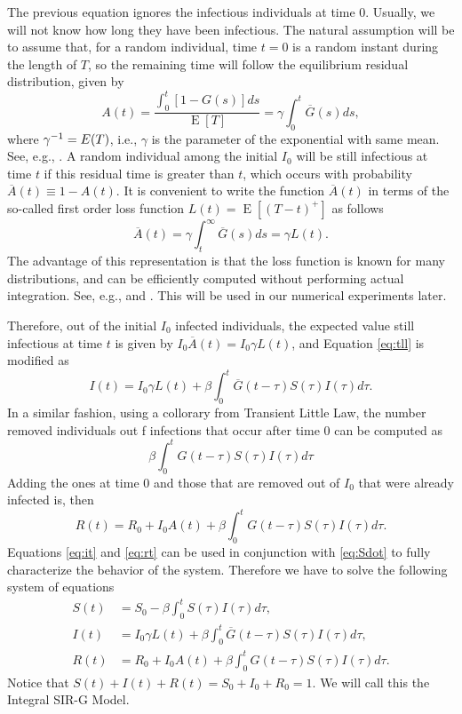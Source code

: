 \documentclass[twoside,USenglish,10pt]{article}
\newcommand{\eg}{e.g.\xspace}
\newcommand{\Ab}{\overline{A}\xspace}
\newcommand{\Gb}{\overline{G}\xspace}
\newcommand{\gami}{\ensuremath\gamma^{-1}\xspace}
\DeclareMathOperator{\Exp}{E}       %
\newcommand{\E}[1]{\Exp\left[{#1}\right]}       %
\begin{document}
The previous equation ignores the infectious individuals at time 0. Usually, we will not know how long they have been infectious. The natural assumption will be to assume that, for a random individual, time $t=0$ is a random instant during the length of $T$, so the remaining time will follow the equilibrium residual distribution, given by
\begin{equation}
	A(t) =  \frac{\int_0^t[1-G(s)]ds}{\Exp{[T]}} = \gamma \int_0^t \Gb(s)ds,
\label{eq:eqdist}
\end{equation}
where $\gami=E(T)$, i.e., $\gamma$ is the parameter of the exponential with same mean. See, e.g., \cite{kulk95}. A random individual among the initial $I_0$ will be still infectious at time $t$ if this residual time is greater than $t$, which occurs with probability $\Ab(t)\equiv 1- A(t)$. 
It is convenient to write the function  $\Ab(t)$ in terms of the so-called first order loss function $L(t)=\E{(T-t)^+}$ as follows
\[ \Ab(t) = \gamma \int_t^\infty \Gb(s)ds = \gamma L(t).\]
The advantage of this representation is that the loss function is known for many distributions, and can be efficiently computed without performing actual integration. See, \eg, \cite[Page 14]{burn.ea.10} and \cite[Appendix C]{zipk00}. This will be used in our numerical experiments later.

 

Therefore, out of the initial $I_0$ infected individuals, the expected value still infectious at time $t$ is given by $I_0\Ab(t)=I_0\gamma L(t)$, and Equation \eqref{eq:tll} is modified as
\begin{equation}
	I(t) = I_0\gamma L(t) + \beta\int_0^t \Gb(t-\tau) S(\tau)I(\tau)d\tau.   \label{eq:it}
\end{equation}
In a similar fashion, using a collorary from Transient Little Law, the number removed individuals out f infections that occur after time $0$ can be computed as 
\[ \beta\int_0^t G(t-\tau) S(\tau)I(\tau)d\tau\]
Adding the ones at time $0$ and those that are removed out of $I_0$ that were already infected is, then
\begin{equation}
	R(t) = R_0 + I_0A(t) + \beta\int_0^t G(t-\tau) S(\tau)I(\tau)d\tau.   \label{eq:rt}
\end{equation}
Equations \eqref{eq:it} and \eqref{eq:rt} can be used in conjunction with \eqref{eq:Sdot} to fully characterize the behavior of the system. Therefore we have to solve the following system of equations
\begin{subequations}
\begin{align}
S(t) &= S_0 - \beta\int_0^t  S(\tau)I(\tau)d\tau, \label{eq:st2} \\
I(t) &= I_0 \gamma L(t) + \beta\int_0^t \Gb(t-\tau) S(\tau)I(\tau)d\tau, \label{eq:it2} \\
R(t) &= R_0  + I_0A(t) +  \beta\int_0^t G(t-\tau) S(\tau)I(\tau)d\tau.   \label{eq:rt2}
\end{align}
\end{subequations}
Notice that $S(t)+I(t)+R(t)=S_0+I_0+R_0=1.$ We will call this the Integral SIR-G Model.
\end{document}
